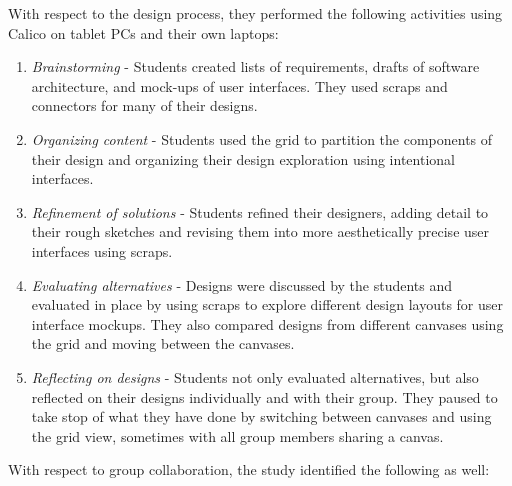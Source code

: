 With respect to the design process, they performed the following activities using Calico on tablet PCs and their own laptops:


\begin{enumerate}
	\item \textit{Brainstorming} - Students created lists of requirements, drafts of software architecture, and mock-ups of user interfaces. They used scraps and connectors for many of their designs.
	\item \textit{Organizing content} - Students used the grid to partition the components of their design and organizing their design exploration using intentional interfaces.
	\item \textit{Refinement of solutions} - Students refined their designers, adding detail to their rough sketches and revising them into more aesthetically precise user interfaces using scraps.
	\item \textit{Evaluating alternatives} - Designs were discussed by the students and evaluated in place by using scraps to explore different design layouts for user interface mockups. They also compared designs from different canvases using the grid and moving between the canvases.
	\item \textit{Reflecting on designs} - Students not only evaluated alternatives, but also reflected on their designs individually and with their group. They paused to take stop of what they have done by switching between canvases and using the grid view, sometimes with all group members sharing a canvas.
\end{enumerate}

With respect to group collaboration, the study identified the following as well:

